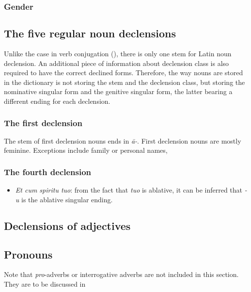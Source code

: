 \documentclass{article}
\newcommand*{\term}[1]{\emph{#1}}
\newcommand*{\corpus}[1]{\emph{#1}}
\begin{document}
\subsubsection{Gender}



\subsection{The five regular noun declensions}\label{sec:regular-noun-declension}

Unlike the case in verb conjugation (), 
there is only one stem for Latin noun declension.
An additional piece of information about declension class 
is also required to have the correct declined forms.
Therefore, the way nouns are stored in the dictionary is not storing the stem and the declension class,
but storing the nominative singular form and the genitive singular form,
the latter bearing a different ending for each declension.

\subsubsection{The first declension}

The stem of first declension nouns ends in \corpus{\={a}-}.
First declension nouns are mostly feminine.
Exceptions include family or personal names,

\subsubsection{The fourth declension}

\begin{itemize}
    \item \corpus{Et cum spiritu tuo}: from the fact that \corpus{tuo} is ablative,
    it can be inferred that \corpus{-u} is the ablative singular ending.
\end{itemize}

\subsection{Declensions of adjectives}\label{sec:regular-adjective-declension}

\subsection{Pronouns}\label{sec:pronoun}

Note that \term{pro}-adverbs or interrogative adverbs are not included in this section.
They are to be discussed in 
\end{document}
